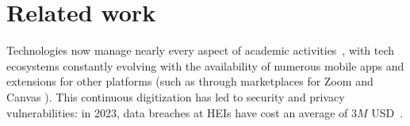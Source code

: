 \section{Related work}
Technologies now manage nearly every aspect of academic activities~\cite{edtechPETS23, constant-expanding-classroom}, with tech ecosystems constantly evolving with the availability of numerous mobile apps and extensions for other platforms (such as through marketplaces for Zoom \cite{zoom} and Canvas \cite{Canvas}). %
This continuous digitization has led to security and privacy vulnerabilities: in 2023, data breaches at HEIs have cost an average of $3M$ USD~\cite{breach-stat}. 


